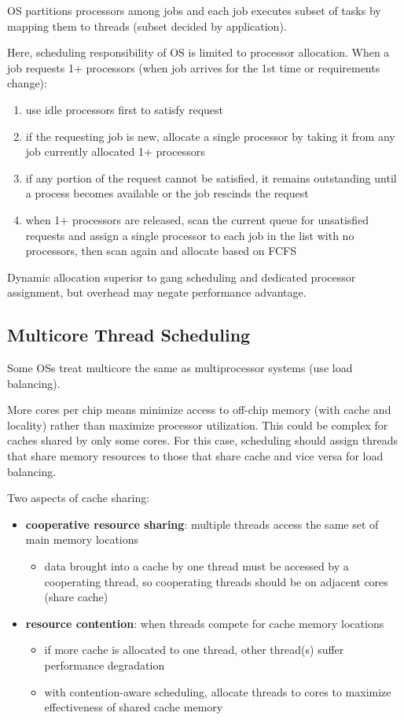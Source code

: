 \documentclass[11pt]{article}
\begin{document}
OS partitions processors among jobs and each job executes subset of tasks by
mapping them to threads (subset decided by application).

Here, scheduling responsibility of OS is limited to processor allocation.
When a job requests 1+ processors (when job arrives for the 1st time or
requirements change):
\begin{enumerate}
\item use idle processors first to satisfy request
\item if the requesting job is new, allocate a single processor by taking it from
any job currently allocated 1+ processors
\item if any portion of the request cannot be satisfied, it remains outstanding
until a process becomes available or the job rescinds the request
\item when 1+ processors are released, scan the current queue for unsatisfied
requests and assign a single processor to each job in the list with no
processors, then scan again and allocate based on FCFS
\end{enumerate}

Dynamic allocation superior to gang scheduling and dedicated processor assignment,
but overhead may negate performance advantage.
\subsection{Multicore Thread Scheduling}
\label{sec:org7595825}
Some OSs treat multicore the same as multiprocessor systems (use load balancing).

More cores per chip means minimize access to off-chip memory (with cache and locality)
rather than maximize processor utilization.
This could be complex for caches shared by only some cores.
For this case, scheduling should assign threads that share memory resources to those
that share cache and vice versa for load balancing.

Two aspects of cache sharing:
\begin{itemize}
\item \textbf{cooperative resource sharing}: multiple threads access the same set of main memory
locations
\begin{itemize}
\item data brought into a cache by one thread must be accessed by a cooperating thread,
so cooperating threads should be on adjacent cores (share cache)
\end{itemize}
\item \textbf{resource contention}: when threads compete for cache memory locations
\begin{itemize}
\item if more cache is allocated to one thread, other thread(s) suffer performance
degradation
\item with contention-aware scheduling, allocate threads to cores to maximize
effectiveness of shared cache memory
\end{itemize}
\end{itemize}
\end{document}

